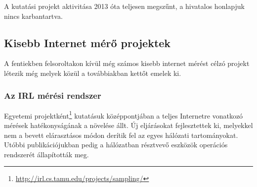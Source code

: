 A kutatási projekt aktivitása 2013 óta teljesen megszűnt, a hivatalos honlapjuk nincs karbantartva.


\subsection{Kisebb Internet mérő projektek}

A fentiekben felsoroltakon kívül még számos kisebb internet mérést célzó projekt létezik még melyek közül a továbbiakban kettőt emelek ki.

\subsubsection*{Az IRL mérési rendszer}
 
 
Egyetemi projektként\footnote{\url{http://irl.cs.tamu.edu/projects/sampling/}} kutatásuk középpontjában a teljes Internetre vonatkozó mérések hatékonyságának a növelése állt. Új eljárásokat fejlesztettek ki, melyekkel nem a bevett elárasztásos módon derítik fel az egyes hálózati tartományokat. Utóbbi publikációjukban\cite{irl-measure} pedig a hálózatban résztvevő eszközök operációs rendszerét állapították meg.
 



